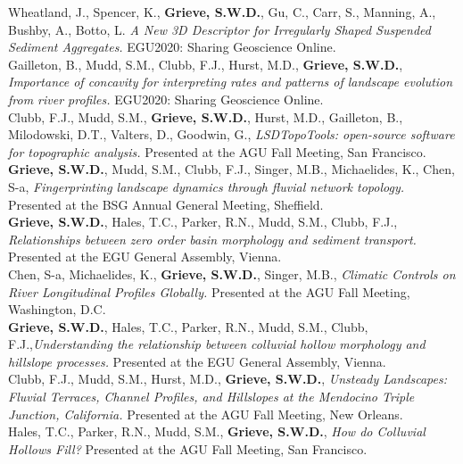 \documentclass[10pt, a4paper]{article}
\newcommand{\years}[1]{\marginnote{\scriptsize #1}}
\begin{document}
\years{2020}Wheatland, J., Spencer, K., \textbf{Grieve, S.W.D.}, Gu, C., Carr, S., Manning, A., Bushby, A., Botto, L. \textit{A New 3D Descriptor for Irregularly Shaped Suspended Sediment Aggregates.} EGU2020: Sharing Geoscience Online.\\[0.05cm]

\years{2020}Gailleton, B., Mudd, S.M., Clubb, F.J., Hurst, M.D., \textbf{Grieve, S.W.D.}, \textit{Importance of concavity for interpreting rates and patterns of landscape evolution from river profiles.} EGU2020: Sharing Geoscience Online.\\[0.05cm]

\years{2019}Clubb, F.J., Mudd, S.M., \textbf{Grieve, S.W.D.}, Hurst, M.D., Gailleton, B., Milodowski, D.T., Valters, D., Goodwin, G., \textit{LSDTopoTools: open-source software for topographic analysis.} Presented at the AGU Fall Meeting, San Francisco.\\[0.05cm]

\years{2019}\textbf{Grieve, S.W.D.}, Mudd, S.M., Clubb, F.J., Singer, M.B., Michaelides, K., Chen, S-a, \textit{Fingerprinting landscape dynamics through fluvial network topology.} Presented at the BSG Annual General Meeting, Sheffield.\\[0.05cm]

\years{2019}\textbf{Grieve, S.W.D.}, Hales, T.C., Parker, R.N., Mudd, S.M., Clubb, F.J., \textit{Relationships between zero order basin morphology and sediment transport.} Presented at the EGU General Assembly, Vienna.\\[0.05cm]

\years{2018}Chen, S-a, Michaelides, K., \textbf{Grieve, S.W.D.}, Singer, M.B., \textit{Climatic Controls on River Longitudinal Profiles Globally.} Presented at the AGU Fall Meeting, Washington, D.C.\\[0.05cm]

\years{2018}\textbf{Grieve, S.W.D.}, Hales, T.C., Parker, R.N., Mudd, S.M., Clubb, F.J.,\textit{Understanding the relationship between colluvial hollow morphology and hillslope processes.} Presented at the EGU General Assembly, Vienna.\\[0.05cm]

\years{2017}Clubb, F.J., Mudd, S.M., Hurst, M.D., \textbf{Grieve, S.W.D.}, \textit{Unsteady Landscapes: Fluvial Terraces, Channel Profiles, and Hillslopes at the Mendocino Triple Junction, California.} Presented at the AGU Fall Meeting, New Orleans.\\[0.05cm]

\years{2016}Hales, T.C., Parker, R.N., Mudd, S.M., \textbf{Grieve, S.W.D.}, \textit{How do Colluvial Hollows Fill?} Presented at the AGU Fall Meeting, San Francisco.\\[0.05cm]
\end{document}
